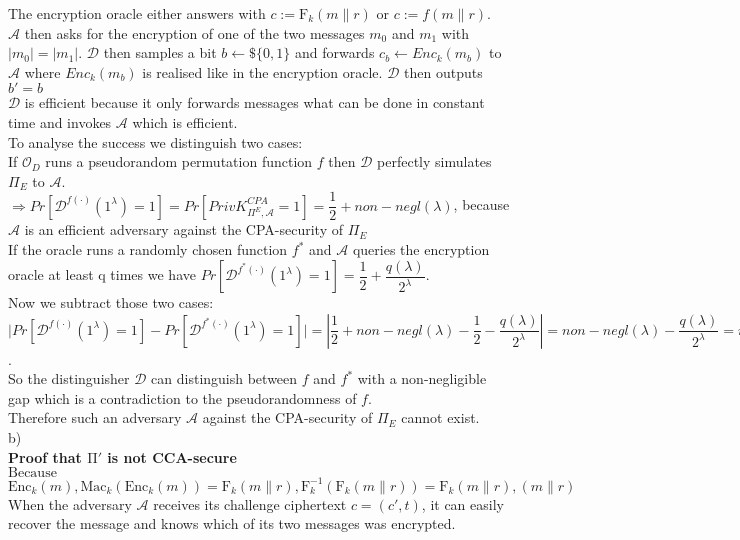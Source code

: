 The encryption oracle either answers with $c := \mathrm{F}_{k}(m \parallel r)$ or  $c := f(m \parallel r)$.\\
\(\mathcal{A}\) then asks for the encryption of one of the two messages \(m_0\) and \(m_1\) with \(\vert m_0 \vert = \vert m_1 \vert \). 
\(\mathcal{D}\) then samples a bit \(b \leftarrow\$ \{0,1\}\) and forwards \(c_b \leftarrow Enc_k(m_b)\) to \(\mathcal{A}\) where \(Enc_k(m_b)\) is realised like in the encryption oracle. 
\(\mathcal{D}\) then outputs $b' = b$ \\
\(\mathcal{D}\) is efficient because it only forwards messages what can be done in constant time and invokes \(\mathcal{A}\) which is efficient.\\
To analyse the success we distinguish two cases:\\
If \(\mathcal{O}_{D}\) runs a pseudorandom permutation function \(f\) then \(\mathcal{D}\) perfectly simulates \(\Pi_{E}\) to \(\mathcal{A}\). \\
\(\Rightarrow Pr[\mathcal{D}^{f(\cdot)}(1^\lambda) = 1] = Pr[PrivK^{CPA}_{\Pi^{E},\mathcal{A}} = 1] = \dfrac{1}{2} + non-negl(\lambda)\), because \(\mathcal{A}\) is an efficient adversary against the CPA-security of \(\Pi_{E}\)\\
If the oracle runs a randomly chosen function \(f^*\) and \(\mathcal{A}\) queries the encryption oracle at least q times we have \(Pr[\mathcal{D}^{f^*(\cdot)}(1^\lambda) = 1] = \dfrac{1}{2} + \dfrac{q(\lambda)}{2^\lambda}\).\\
Now we subtract those two cases:\\
\(\vert Pr[\mathcal{D}^{f(\cdot)}(1^\lambda) = 1] - Pr[\mathcal{D}^{f^*(\cdot)}(1^\lambda) = 1] \vert = \left\vert \dfrac{1}{2} + non-negl(\lambda) - \dfrac{1}{2} - \dfrac{q(\lambda)}{2^\lambda} \right\vert = non-negl(\lambda) - \dfrac{q(\lambda)}{2^\lambda} = non-negl(\lambda) \).\\
 So the distinguisher \(\mathcal{D}\) can distinguish between \(f\) and \(f^*\) with a non-negligible gap which is a contradiction to the pseudorandomness of \(f\).\\
 Therefore such an adversary \(\mathcal{A}\) against the CPA-security of \(\Pi_{E}\) cannot exist.\\
\vskip 1cm
\noindent b)\\
\noindent\textbf{Proof that $\mathrm{\Pi'}$ is not CCA-secure}\\
$\mathrm{Because}$ $\mathrm{Enc}_{k}(m), \mathrm{Mac}_{k}(\mathrm{Enc}_{k}(m)) = \mathrm{F}_{k}(m\parallel r), \mathrm{F}_{k}^{-1}(\mathrm{F}_{k}(m\parallel r)) = \mathrm{F}_{k}(m\parallel r), (m\parallel r)$\\
When the adversary $\mathcal{A}$ receives its challenge ciphertext $c = (c', t)$, it can easily recover the message and knows which of its two messages was encrypted.



